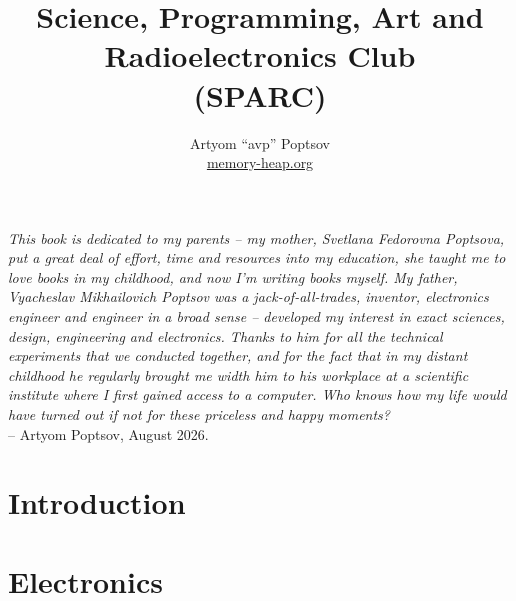 \documentclass[a4paper,twoside]{book}
\title{Science, Programming, Art and Radioelectronics Club\\(SPARC)}
\author{Artyom ``avp'' Poptsov\\\href{https://memory-heap.org}{memory-heap.org}}
\begin{document}
\maketitle

\tableofcontents

\newpage
\vspace*{\fill}

\noindent
\begin{minipage}{0.48\textwidth}
  \mbox{}
\end{minipage}
\hfill
\begin{minipage}{0.48\textwidth}
  \emph{This book is dedicated to my parents -- my mother, Svetlana Fedorovna
  Poptsova, put a great deal of effort, time and resources into my education,
  she taught me to love books in my childhood, and now I'm writing books myself.
  My father, Vyacheslav Mikhailovich Poptsov was a jack-of-all-trades, inventor,
  electronics engineer and engineer in a broad sense -- developed my interest in
  exact sciences, design, engineering and electronics.  Thanks to him for all
  the technical experiments that we conducted together, and for the fact that in
  my distant childhood he regularly brought me width him to his workplace at a
  scientific institute where I first gained access to a computer.  Who knows how
  my life would have turned out if not for these priceless and happy moments?}
  \\
  -- Artyom Poptsov, August 2026.
\end{minipage}

\vspace*{\fill}

\chapter*{Introduction}




\chapter{Electronics}
\label{chapter:electronics}







\end{document}
